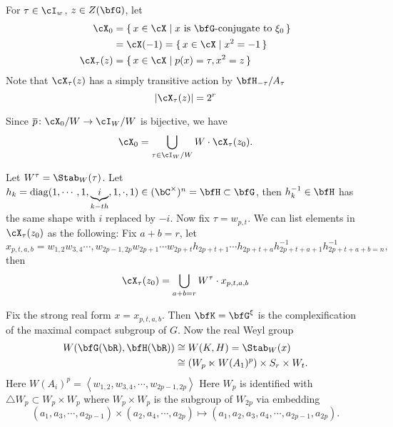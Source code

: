 \documentclass[12pt,a4paper]{amsart}
\def\gen#1{\left\langle
    #1
      \right\rangle}
\newcommand{\diag}{\operatorname{diag}}
\numberwithin{equation}{section}
\theoremstyle{remark}
\begin{document}
For $\tau\in \cI_w$, $z\in Z(\bfG)$, let  
\begin{align*}
  \cX_0 &= \set{x\in \cX | \text{$x$ is $\bfG$-conjugate to $\xi_0$}} \\
        & = \cX(-1) = \set{x\in\cX | x^2 = -1}\\
  \cX_\tau(z) & = \set{x\in \cX | p(x) = \tau, x^2= z}
\end{align*}
Note that $\cX_\tau(z)$ has a simply transitive action by $\bfH_{-\tau}/A_\tau$
\cite[Prop~11.2]{AC}
\[
  |\cX_\tau(z)| = 2^r
\]

Since $\overline{p}\colon \cX_0/W \to \cI_W/W$ is bijective\cite[Prop~12.12]{AC}, we have  
\[
  \cX_0 = \bigcup_{\tau \in \cI_W/W} W\cdot \cX_\tau(z_0).
\]

Let $W^\tau = \Stab_W(\tau)$. 
Let $h_k = \diag(1, \cdots, 1, \underbrace{i}_{k-th},1,
\cdot, 1)\in (\bC^\times)^n = \bfH \subset \bfG$, then $h_k^{-1}\in \bfH$ has the same
shape with $i$ replaced by $-i$.
Now fix $\tau = w_{p,t}$. We can list elements in $\cX_\tau(z_0)$ as the
following: Fix $a+b=r$, 
let
\[
  x_{p,t,a,b} = w_{1,2}w_{3,4}\cdots, w_{2p-1,2p} w_{2p+1}\cdots w_{2p+t}
  h_{2p+t+1}\cdots h_{2p+t+a} h_{2p+t+a+1}^{-1}h_{2p+t+a+b=n}^{-1},
\]
then
\[
  \cX_\tau(z_0) = \bigcup_{a+b=r} W^\tau \cdot x_{p,t,a,b}
\]

Fix the strong real form $x = x_{p,t,a,b}$. Then $\bfK= \bfG^\xi$ is the
complexification of the maximal compact subgroup of $G$.  Now the real Weyl
group
\[
  \begin{split}
    W(\bfG(\bR), \bfH(\bR)) &\cong  W(K,H) = \Stab_W(x) \\ 
    &\cong (W_p \ltimes W(A_1)^p)\times S_r\times W_{t}.
  \end{split}
\]
Here $W(A_i)^p = \gen{w_{1,2}, w_{3,4},\cdots, w_{2p-1, 2p}}$
Here $W_p$ is identified with $\triangle W_p \subset W_p\times W_p$ where
$W_p\times W_p$ is the subgroup of $W_{2p}$ via embedding
\[
  (a_1,a_3, \cdots, a_{2p-1})\times (a_2, a_4, \cdots, a_{2p}) \mapsto (a_1, a_2,
a_3, a_4, \cdots, a_{2p-1},a_{2p}).
\]
\end{document}
